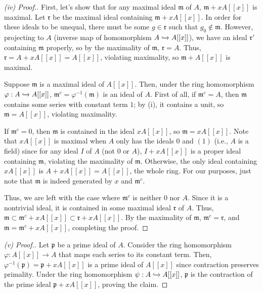\begin{proof}[(iv) Proof.]
First, let's show that for any maximal ideal $\mathfrak{m}$ of $A$, $\mathfrak{m} + xA[[x]]$ is maximal. Let $\mathfrak{r}$ be the maximal ideal containing $\mathfrak{m} + xA[[x]]$. 
In order for these ideals to be unequal, there must be some $g \in \mathfrak{r}$ such that $g_0 \not\in \mathfrak{m}$. However, projecting to $A$ (inverse map of homomorphism $A \xhookrightarrow{} A[[x]]$), 
we have an ideal $\mathfrak{r}'$ containing $\mathfrak{m}$ properly, so by the maximality of $\mathfrak{m}$, $\mathfrak{r} = A$. Thus, $\mathfrak{r} = A + xA[[x]] = A[[x]]$, violating maximality, so 
$\mathfrak{m} + A[[x]]$ is maximal.


Suppose $\mathfrak{m}$ is a maximal ideal of $A[[x]]$. Then, under the ring homomorphism $\varphi : A \xhookrightarrow{} A[[x]]$, $\mathfrak{m}^c = \varphi^{-1}(\mathfrak{m})$
is an ideal of $A$. First of all, if $\mathfrak{m}^c = A$, then $\mathfrak{m}$ contains some series with constant term $1$; by (i), it contains a unit, so $\mathfrak{m} = A[[x]]$,
violating maximality. 

If $\mathfrak{m}^c = 0$, then $\mathfrak{m}$ is contained in the ideal $xA[[x]]$, so $\mathfrak{m} = xA[[x]]$. Note that $xA[[x]]$ is 
maximal when $A$ only has the ideals $0$ and $(1)$ (i.e., $A$ is a field) since for any ideal $I$ of $A$ (not $0$ or $A$), $I + xA[[x]]$ is a 
proper ideal containing $\mathfrak{m}$, violating the maximality of $\mathfrak{m}$. Otherwise, the only ideal containing $xA[[x]]$ is 
$A + xA[[x]] = A[[x]]$, the whole ring. For our purposes, just note that $\mathfrak{m}$ is indeed generated by $x$ and $\mathfrak{m}^c$.

Thus, we are left with the case where $\mathfrak{m}^c$ is neither $0$ nor $A$. Since it is a nontrivial ideal, it is contained in some maximal ideal $\mathfrak{r}$ of $A$. Thus,
$\mathfrak{m} \subset \mathfrak{m}^c + xA[[x]] \subset \mathfrak{r} + xA[[x]]$. By the maximality of $\mathfrak{m}$, $\mathfrak{m}^c = \mathfrak{r}$, and $\mathfrak{m} = \mathfrak{m}^c + xA[[x]]$,
completing the proof.
\end{proof}

\begin{proof}[(v) Proof.]
Let $\mathfrak{p}$ be a prime ideal of $A$. Consider the ring homomorphism $\varphi : A[[x]] \to A$ that maps each series to its constant term. Then,
$\varphi^{-1}(\mathfrak{p}) = \mathfrak{p} + xA[[x]]$ is a prime ideal of $A[[x]]$ since contraction preserves primality. Under the ring homomorphism
$\psi : A \xhookrightarrow{} A[[x]]$, $\mathfrak{p}$ is the contraction of the prime ideal $\mathfrak{p} + xA[[x]]$, proving the claim.
\end{proof}

